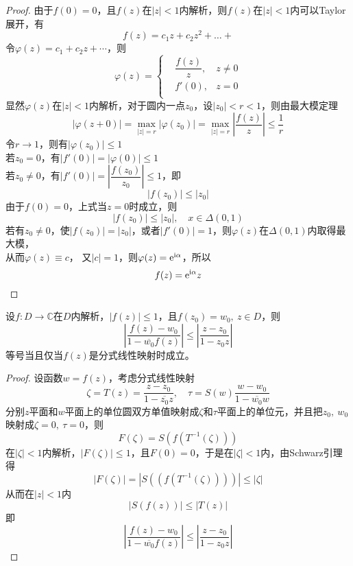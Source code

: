 \begin{proof}
    
        
    由于$f(0) = 0$，且$f(z)$在$|z| < 1$内解析，则$f(z)$在$|z|<1$内可以\textup{Taylor}展开，有
    $$f(z) = c_1 z + c_2 z^2 + \dots + $$
    令$\varphi(z) =  c_1 + c_2 z + \cdots $，则
    $$
    \varphi(z) = 
    \left\{
        \begin{aligned}
            & \dfrac{f(z)}{z}, & z \neq 0\\
            &f'(0), & z = 0\\
        \end{aligned}
    \right.
    $$
    显然$\varphi(z)$在$|z| < 1$内解析，对于圆内一点$z_0$，设$|z_0| < r < 1$，则由最大模定理
    $$|\varphi(z+0)| = \max_{|z| = r}|\varphi(z_0)| = \max_{|z| = r}{\left| \dfrac{f(z)}{z}\right|} \leq \dfrac{1}{r}$$
    令$r \to 1$，则有$|\varphi(z_0)| \leq 1$\\
    若$z_0 = 0$，有$|f'(0)| = |\varphi(0)| \leq 1$\\
    若$z_0 \neq 0$，有$|f'(0)| = \left| \dfrac{f(z_0)}{z_0} \right| \leq 1$，即
    $$|f(z_0)| \leq |z_0|$$
    由于$f(0) = 0$，上式当$z = 0$时成立，则
    $$|f(z_0)| \leq |z_0|,\quad x\in \Delta(0,1)$$
    若有$z_0 \neq 0$，使$|f(z_0)| = |z_0| $，或者$|f'(0)| = 1$，则$\varphi(z)$在$\Delta(0,1)$内取得最大模，\\
    从而$\varphi(z) \equiv c$， 又$|c| = 1$，则$\varphi(z) = \mathrm{e}^{\mathrm{i}\alpha}$，所以
    $$f(z) = \mathrm{e}^{\mathrm{i}\alpha}z$$

\end{proof}

\begin{theorem}

    设$f:D \to \mathbb{C}$在$D$内解析，$|f(z)| \leq 1$，且$f(z_0) = w_0,\ z\in D$，则
    $$ \left| \dfrac{f(z)-w_0}{1 - \overline{w_0}f(z)}\right| \leq \left| \dfrac{z-z_0}{1 - z_0z}\right|$$
    等号当且仅当$f(z)$是分式线性映射时成立。

\end{theorem}

\begin{proof}
    
    设函数$w =f(z)$，考虑分式线性映射
    $$\zeta = T(z) = \dfrac{z - z_0}{1 - \overline{z_0}z},\quad \tau = S(w) \dfrac{w - w_0}{1 - \overline{w_0}w}$$
    分别$z$平面和$w$平面上的单位圆双方单值映射成$\zeta$和$\tau$平面上的单位元，并且把$z_0,\ w_0$映射成$\zeta = 0,\ \tau = 0$，则
    $$F(\zeta) = S(f(T^{-1}(\zeta)))$$
    在$|\zeta| < 1$内解析，$|F(\zeta)| \leq 1$，且$F(0) = 0$，于是在$|\zeta| < 1$内，由\textup{Schwarz}引理得
    $$|F(\zeta)| = |S((f(T^{-1}(\zeta))))| \leq |\zeta|$$
    从而在$|z|<1$内
    $$|S(f(z))| \leq |T(z)|$$
    即
    $$ \left| \dfrac{f(z)-w_0}{1 - \overline{w_0}f(z)}\right| \leq \left| \dfrac{z-z_0}{1 - z_0z}\right|$$
    
\end{proof}